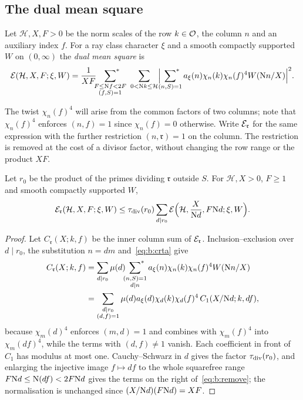 \subsection{The dual mean square}\label{ssec:b:dual}

\begin{definition}\label{def:b:energy}
Let $\mathcal H,X,F>0$ be the norm scales of the row $k\in\mathcal{O}$, the column $n$ and an auxiliary index $f$. For a ray class character $\xi$ and a smooth compactly supported $W$ on $(0,\infty)$ the \emph{dual mean square} is
\begin{equation}\label{eq:b:energy}
  \mathcal{E}(\mathcal H,X,F;\xi,W)=\frac1{XF}\sideset{}{^*}\sum_{\substack{F\le\mathrm{N} f<2F\\(f,S)=1}}\ \sum_{0<\mathrm{N} k\le\mathcal H}\Bigl|\sideset{}{^*}\sum_{(n,S)=1}a_\xi(n)\chi_n(k)\chi_n(f)^4W(\mathrm{N} n/X)\Bigr|^2.
\end{equation}
\end{definition}

The twist $\chi_n(f)^4$ will arise from the common factors of two columns; note that $\chi_n(f)^4$ enforces $(n,f)=1$ since $\chi_n(f)=0$ otherwise. Write $\mathcal{E}_{\mathfrak r}$ for the same expression with the further restriction $(n,\mathfrak r)=1$ on the column. The restriction is removed at the cost of a divisor factor, without changing the row range or the product $XF$.

\begin{lemma}\label{lem:b:remove}
Let $r_0$ be the product of the primes dividing $\mathfrak r$ outside $S$. For $\mathcal H,X>0$, $F\ge1$ and smooth compactly supported $W$,
\begin{equation}\label{eq:b:remove}
  \mathcal{E}_{\mathfrak r}(\mathcal H,X,F;\xi,W)\le\tau_{\rm div}(r_0)\sum_{d\mid r_0}\mathcal{E}\Bigl(\mathcal H,\frac X{\mathrm{N} d},F\mathrm{N} d;\xi,W\Bigr).
\end{equation}
\end{lemma}

\begin{proof}
Let $C_{\mathfrak r}(X;k,f)$ be the inner column sum of $\mathcal{E}_{\mathfrak r}$. Inclusion--exclusion over $d\mid r_0$, the substitution $n=dm$ and~\eqref{eq:b:crta} give
\[
\begin{aligned}
  C_{\mathfrak r}(X;k,f)&=\sum_{d\mid r_0}\mu(d)\sideset{}{^*}\sum_{\substack{(n,S)=1\\d\mid n}}a_\xi(n)\chi_n(k)\chi_n(f)^4W(\mathrm{N} n/X)\\
  &=\sum_{\substack{d\mid r_0\\(d,f)=1}}\mu(d)a_\xi(d)\chi_d(k)\chi_d(f)^4\,C_1(X/\mathrm{N} d;k,df),
\end{aligned}
\]
because $\chi_m(d)^4$ enforces $(m,d)=1$ and combines with $\chi_m(f)^4$ into $\chi_m(df)^4$, while the terms with $(d,f)\ne1$ vanish. Each coefficient in front of $C_1$ has modulus at most one. Cauchy--Schwarz in $d$ gives the factor $\tau_{\rm div}(r_0)$, and enlarging the injective image $f\mapsto df$ to the whole squarefree range $F\mathrm{N} d\le\mathrm{N}(df)<2F\mathrm{N} d$ gives the terms on the right of~\eqref{eq:b:remove}; the normalisation is unchanged since $(X/\mathrm{N} d)(F\mathrm{N} d)=XF$.
\end{proof}

